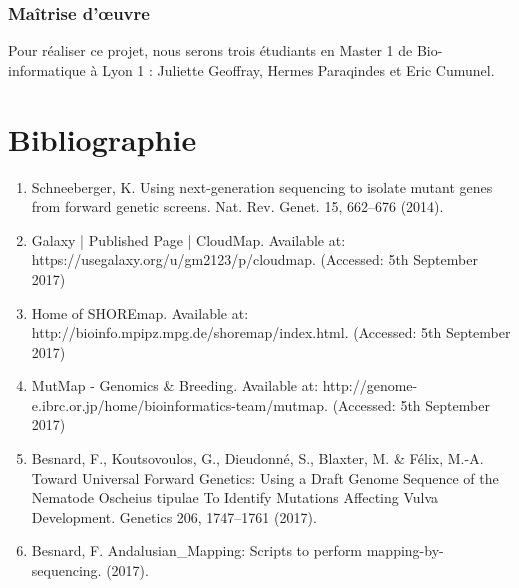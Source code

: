 \documentclass[12pt]{article}
\begin{document}
\subsubsection{Maîtrise d’œuvre}

Pour réaliser ce projet, nous serons trois étudiants en Master 1 de Bio-informatique à Lyon 1 : Juliette Geoffray, Hermes Paraqindes et Eric Cumunel.

\section{Bibliographie}
\begin{enumerate}
\item Schneeberger, K. Using next-generation sequencing to isolate mutant genes from forward genetic screens. Nat. Rev.
Genet. 15, 662–676 (2014).
\item Galaxy | Published Page | CloudMap. Available at: https://usegalaxy.org/u/gm2123/p/cloudmap. (Accessed: 5th
September 2017)
\item Home of SHOREmap. Available at: http://bioinfo.mpipz.mpg.de/shoremap/index.html. (Accessed: 5th September
2017)
\item MutMap - Genomics \& Breeding. Available at: http://genome-e.ibrc.or.jp/home/bioinformatics-team/mutmap.
(Accessed: 5th September 2017)
\item Besnard, F., Koutsovoulos, G., Dieudonné, S., Blaxter, M. \& Félix, M.-A. Toward Universal Forward Genetics:
Using a Draft Genome Sequence of the Nematode Oscheius tipulae To Identify Mutations Affecting Vulva
Development. Genetics 206, 1747–1761 (2017).
\item Besnard, F. Andalusian\_Mapping: Scripts to perform mapping-by-sequencing. (2017).
\end{enumerate}
\end{document}
